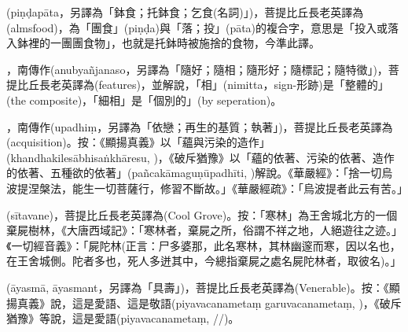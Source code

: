 \startitemgroup[noteitems]
\item{}(piṇḍapāta，另譯為「鉢食；托鉢食；乞食(名詞)」)，菩提比丘長老英譯為(almsfood)，為「團食」(piṇḍa)與「落；投」(pāta)的複合字，意思是「投入或落入鉢裡的一團團食物」，也就是托鉢時被施捨的食物，今準此譯。
\stopitemgroup

\startitemgroup[noteitems]
\item{}，南傳作(anubyañjanaso，另譯為「隨好；隨相；隨形好；隨標記；隨特徵」)，菩提比丘長老英譯為(features)，並解說，「相」(nimitta，sign-形跡)是「整體的」(the composite)，「細相」是「個別的」(by seperation)。
\stopitemgroup

\startitemgroup[noteitems]
\item{}，南傳作(upadhiṃ，另譯為「依戀；再生的基質；執著」)，菩提比丘長老英譯為(acquisition)。按：《顯揚真義》以「蘊與污染的造作」(khandhakilesābhisaṅkhāresu, )，《破斥猶豫》以「蘊的依著、污染的依著、造作的依著、五種欲的依著」(pañcakāmaguṇūpadhīti, )解說。《華嚴經》：「捨一切烏波提涅槃法，能生一切菩薩行，修習不斷故。」《華嚴經疏》：「烏波提者此云有苦。」
\stopitemgroup

\startitemgroup[noteitems]
\item{}(sītavane)，菩提比丘長老英譯為(Cool Grove)。按：「寒林」為王舍城北方的一個棄屍樹林，《大唐西域記》：「寒林者，棄屍之所，俗謂不祥之地，人絕遊往之迹。」《一切經音義》：「屍陀林(正言：尸多婆那，此名寒林，其林幽𨗉而寒，因以名也，在王舍城側。陀者多也，死人多迸其中，今總指棄屍之處名屍陀林者，取彼名)。」
\stopitemgroup

\startitemgroup[noteitems]
\item{}(āyasmā, āyasmant，另譯為「具壽」)，菩提比丘長老英譯為(Venerable)。按：《顯揚真義》說，這是愛語、這是敬語(piyavacanametaṃ garuvacanametaṃ, )，《破斥猶豫》等說，這是愛語(piyavacanametaṃ, //)。
\stopitemgroup

